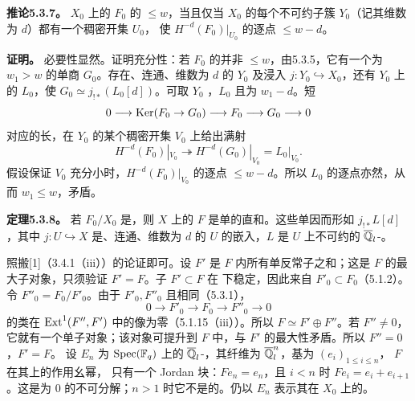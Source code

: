 \par\medskip\noindent\textbf{推论5.3.7。} $X_0$ 上的 $F_0$ 的 $\le w$，当且仅当 $X_0$ 的每个不可约子簇 $Y_0$（记其维数为 $d$）都有一个稠密开集 $U_0$，
使 $H^{-d}(F_0)|_{U_0}$ 的逐点 $\le w-d$。

\par\noindent\textbf{证明。} 必要性显然。证明充分性：若 $F_0$ 的并非 $\le w$，由5.3.5，它有一个为 $w_1>w$ 的单商 $G_0$。存在、连通、维数为 $d$ 的 $Y_0$ 及浸入 $j:Y_0\hookrightarrow X_0$，还有 $Y_0$ 上的 $L_0$，使 $G_0\simeq j_{!*}(L_0[d])$。可取 $Y_0$ ，$L_0$ 且为 $w_1-d$。短
\[
0\longrightarrow\operatorname{Ker}(F_0\to G_0)\longrightarrow F_0\longrightarrow G_0\longrightarrow0
\]
对应的长，在 $Y_0$ 的某个稠密开集 $V_0$ 上给出满射
\[
H^{-d}(F_0)|_{V_0}\twoheadrightarrow H^{-d}(G_0)|_{V_0}=L_0|_{V_0}.
\]
假设保证 $V_0$ 充分小时，$H^{-d}(F_0)|_{V_0}$ 的逐点 $\le w-d$。所以 $L_0$ 的逐点亦然，从而 $w_1\le w$，矛盾。

\par\medskip\noindent\textbf{定理5.3.8。} 若 $F_0/X_0$ 是，则 $X$ 上的 $F$ 是单的直和。这些单因而形如 $j_{!*}L[d]$，其中 $j:U\hookrightarrow X$ 是、连通、维数为 $d$ 的 $U$ 的嵌入，$L$ 是 $U$ 上不可约的 $\overline{\mathbb Q}_l$-。

照搬[1]（3.4.1（iii））的论证即可。设 $F'$ 是 $F$ 内所有单反常子之和；这是 $F$ 的最大子对象，只须验证 $F'=F$。子 $F'\subset F$ 在  下稳定，因此来自 $F'_0\subset F_0$（5.1.2）。令 $F''_0=F_0/F'_0$。由于 $F'_0,F''_0$ 且相同（5.3.1），
\[
0\longrightarrow F'_0\longrightarrow F_0\longrightarrow F''_0\longrightarrow0
\]
的类在 $\operatorname{Ext}^1(F'',F')$ 中的像为零（5.1.15（iii））。所以 $F\simeq F'\oplus F''$。若 $F''\ne0$，它就有一个单子对象；该对象可提升到 $F$ 中，与 $F'$ 的最大性矛盾。所以 $F''=0$，$F'=F$。
设 $E_n$ 为 $\operatorname{Spec}(\mathbb F_q)$ 上的 $\overline{\mathbb Q}_l$-，其纤维为 $\overline{\mathbb Q}_l^n$，基为 $(e_i)_{1\le i\le n}$， $F$ 在其上的作用幺幂，
只有一个 Jordan 块：$Fe_n=e_n$，且 $i<n$ 时 $Fe_i=e_i+e_{i+1}$。这是为 $0$ 的不可分解；$n>1$ 时它不是的。仍以 $E_n$ 表示其在 $X_0$ 上的。

